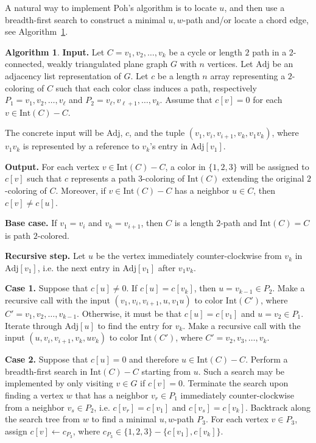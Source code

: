 \documentclass[12pt,letterpaper]{article}
\theoremstyle{plain}
\theoremstyle{definition}
\theoremstyle{break}
\newtheorem{algorithm}[lemma]{Algorithm}     %
\begin{document}
A natural way to implement Poh's algorithm is to locate $u$,
and then use a breadth-first search to construct a minimal
$u,w$-path and/or locate a chord edge, see Algorithm~\ref{A:poh_bfs}.

\begin{algorithm}\label{A:poh_bfs}
\textbf{Input.} 
Let $C=v_1,v_2,\ldots,v_k$ be a cycle or length $2$ path
in a $2$-connected,
weakly triangulated plane
graph $G$ with $n$ vertices.
Let $\text{Adj}$ be an adjacency list representation of $G$.
Let  $c$ be a length $n$ array representing a $2$-coloring of $C$ such
that each color class induces a path, respectively
$P_1=v_1,v_2,\ldots,v_\ell$ and $P_2=v_\ell,v_{\ell+1},\ldots,v_k$. Assume that
$c[v]=0$ for each $v\in\text{Int}(C)-C$.

The concrete input will be $\text{Adj}$, $c$, and the tuple
$(v_1, v_i, v_{i+1}, v_k, v_1v_k)$, where $v_1v_k$ is represented by
a reference to $v_k$'s entry in $\text{Adj}[v_1]$. 

\textbf{Output.} For each vertex $v\in\text{Int}(C)-C$, a color in
$\{1,2,3\}$ will be
assigned to $c[v]$ such that $c$ represents a path $3$-coloring of
$\text{Int}(C)$ extending the original $2$-coloring of $C$. Moreover, if
$v\in \text{Int}(C)-C$ has a neighbor $u\in C$, then $c[v]\ne c[u]$.

\textbf{Base case.} If $v_1=v_i$ and $v_k=v_{i+1}$, then $C$ is a length
$2$-path and $\text{Int}(C)=C$ is path $2$-colored.

\textbf{Recursive step.} Let $u$ be the vertex immediately counter-clockwise
from $v_k$ in $\text{Adj}[v_1]$, i.e. the next entry in $\text{Adj}[v_1]$
after $v_1v_k$.

\textbf{Case 1.} Suppose that $c[u]\ne 0$.
If $c[u]=c[v_k]$, then $u=v_{k-1}\in P_2$. Make a recursive call with the input
$(v_1, v_i, v_{i+1}, u, v_1u)$ to color $\text{Int}(C')$,
where $C'=v_1,v_2,\ldots,v_{k-1}$. Otherwise, it must be that $c[u]=c[v_1]$
and $u=v_2\in P_1$. Iterate through $\text{Adj}[u]$ to find the entry for
$v_k$. Make a recursive call with the input $(u, v_i, v_{i+1}, v_k, uv_k)$
to color $\text{Int}(C')$, where $C'=v_2,v_3,\ldots,v_k$. 

\textbf{Case 2.} Suppose that $c[u]=0$ and therefore $u\in \text{Int}(C)-C$.
Perform a breadth-first search in $\text{Int}(C)-C$ starting from $u$.
Such a search may be implemented by only visiting $v\in G$
if $c[v]=0$. Terminate the search upon finding a vertex
$w$ that has a neighbor $v_r\in P_1$
immediately counter-clockwise from a neighbor $v_s\in P_2$, i.e.
$c[v_r]=c[v_1]$ and $c[v_s]=c[v_k]$. Backtrack along the search tree from $w$
to find a minimal $u,w$-path $P_3$.
For each vertex $v\in P_3$, assign $c[v]\leftarrow c_{P_3}$, where $c_{P_3}\in
\{1,2,3\}-\{c[v_1],c[v_k]\}$.


\end{algorithm}
\end{document}
